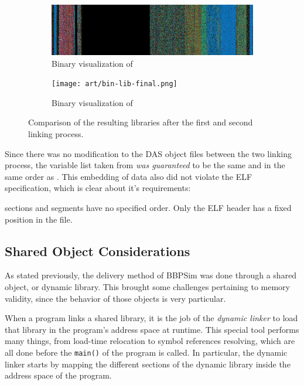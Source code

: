 {\begin{figure}[htbp]
	\centering
	\begin{subfigure}{\linewidth}
		\centering
		\includegraphics[width=\linewidth, keepaspectratio]{art/bin-lib-intermediate.png}
		\caption{Binary visualization of }
		\label{fig:bin-lib-intermediate}
	\end{subfigure}
	\vspace{12pt}
	\begin{subfigure}{\linewidth}
		\centering
		\texttt{[image: art/bin-lib-final.png]}
		\caption{Binary visualization of }
		\label{fig:bin-lib-final}
	\end{subfigure}
	\caption{Comparison of the resulting libraries after the first and second linking process.}
	\label{fig:bin-lib-comp}
\end{figure}

Since there was no modification to the DAS object files between the two linking process, the variable list taken from  \textit{was guaranteed} to be the same and in the same order as . This embedding of data also did not violate the ELF specification, which is clear about it's requirements:

\begin{shadedquotation}
[...] sections and segments have no specified order. Only the ELF header has a fixed position in the file.\cite{online:elf-spec}
\end{shadedquotation}

\subsection*{Shared Object Considerations}
As stated previously, the delivery method of BBPSim was done through a shared object, or dynamic library. This brought some challenges pertaining to memory validity, since the behavior of those objects is very particular.

When a program links a shared library, it is the job of the \textit{dynamic linker} to load that library in the program's address space at runtime. This special tool performs many things, from load-time relocation to symbol references resolving\cite{online:elf-reloc}, which are all done before the \texttt{main()} of the program is called. In particular, the dynamic linker starts by mapping the different sections of the dynamic library inside the address space of the program. 

}
